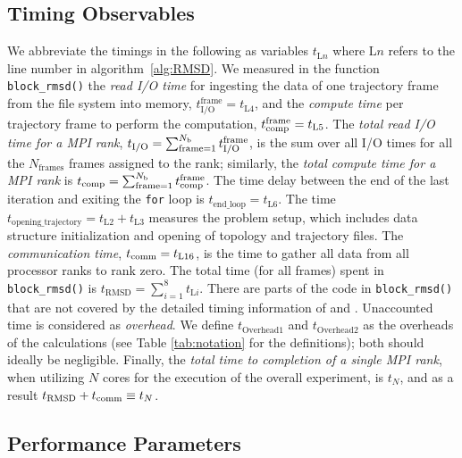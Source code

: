 \subsection{Timing Observables}

We abbreviate the timings in the following as variables $t_{\text{L$n$}}$ where $\text{L$n$}$ refers to the line number in algorithm~\ref{alg:RMSD}.
We measured in the function \texttt{block\_rmsd()} the \emph{read I/O time} for ingesting the data of one trajectory frame from the file system into memory, $t_{\text{I/O}}^{\text{frame}} = t_{\text{L4}}$, and the \emph{compute time} per trajectory frame to perform the computation, ${t}_{\text{comp}}^{\text{frame}} = t_{\text{L5}}$.
The \emph{total read I/O time for a MPI rank},  ${t}_{\text{I/O}} = \sum_{\text{frame}=1}^{N_{\text{b}}} {t}_{\text{I/O}}^{\text{frame}}$, is the sum over all I/O times for all the $N_{\text{frames}}$ frames assigned to the rank; similarly, the \emph{total compute time for a MPI rank} is ${t}_{\text{comp}} = \sum_{\text{frame}=1}^{N_{\text{b}}} {t}_{\text{comp}}^{\text{frame}}$. 
The time delay between the end of the last iteration and exiting the \texttt{for} loop is $t_{\text{end\_loop}} = t_{\text{L6}}$.
The time $t_{\text{opening\_trajectory}} = t_{\text{L2}}+t_{\text{L3}}$ measures the problem setup, which includes data structure initialization and opening of topology and trajectory files.
The \emph{communication time}, $t_{\text{comm}} = t_{\text{L16}}$, is the time to gather all data from all processor ranks to rank zero.
The total time (for all frames) spent in \texttt{block\_rmsd()} is $t_{\text{RMSD}} = \sum_{i=1}^{8}t_{\text{L$i$}}$. 
There are parts of the code in \texttt{block\_rmsd()} that are not covered by the detailed timing information of \tcomp and \tIO.
Unaccounted time is considered as \emph{overhead}.
We define $t_{\text{Overhead1}}$ and $t_{\text{Overhead2}}$ as the overheads of the calculations (see Table \ref{tab:notation} for the definitions); both should ideally be negligible. 
Finally, the \emph{total time to completion of a single MPI rank}, when utilizing $N$ cores for the execution of the overall experiment, is $t_{N}$, and as a result $t_{\text{RMSD}} + t_{\text{comm}} \equiv t_{N}$.

\subsection{Performance Parameters}

